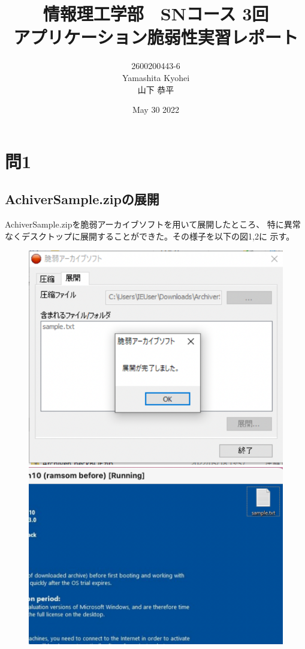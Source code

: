 \documentclass[dvipdfmx,autodetect-engine,titlepage]{jsarticle}
\title{情報理工学部　SNコース 3回\\
アプリケーション脆弱性実習レポート\\}
\author{2600200443-6\\Yamashita Kyohei\\山下 恭平}
\date{May 30 2022}
\begin{document}
\maketitle

\section{問1}

\subsection{AchiverSample.zipの展開}

AchiverSample.zipを脆弱アーカイブソフトを用いて展開したところ、
特に異常なくデスクトップに展開することができた。その様子を以下の図1,2に
示す。

\begin{figure}[h]
  \centering
  \begin{minipage}[b]{0.45\linewidth}
  \begin{center}
    \includegraphics[keepaspectratio,scale=0.65]{pic1-1.png}
    \end{center}
    \caption{}
  \end{minipage}
  \begin{minipage}[b]{0.45\linewidth}
  \begin{center}
    \includegraphics[keepaspectratio,scale=0.55]{pic1-2.png}

\end{center}
\end{minipage}
\end{figure}
\end{document}
